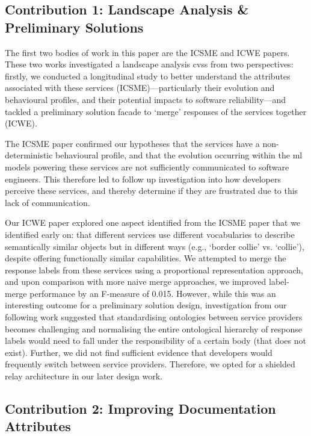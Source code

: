 \subsection{Contribution 1: Landscape Analysis \& Preliminary Solutions}

The first two bodies of work in this paper are the ICSME and ICWE papers. These two works investigated a landscape analysis \glspl{cvs} from two perspectives: firstly, we conducted a longitudinal study to better understand the attributes associated with these services (ICSME)---particularly their evolution and behavioural profiles, and their potential impacts to software reliability---and tackled a preliminary solution facade to `merge' responses of the services together (ICWE). 

The ICSME paper confirmed our hypotheses that the services have a non-deterministic behavioural profile, and that the evolution occurring within the \gls{ml} models powering these services are not sufficiently communicated to software engineers. This therefore led to follow up investigation into how developers perceive these services, and thereby determine if they are frustrated due to this lack of communication. 

Our ICWE paper explored one aspect identified from the ICSME paper that we identified early on: that different services use different vocabularies to describe semantically similar objects but in different ways (e.g., `border collie' vs. `collie'), despite offering functionally similar capabilities. We attempted to merge the response labels from these services using a proportional representation approach, and upon comparison with more naive merge approaches, we improved label-merge performance by an F-measure of 0.015. However, while this was an interesting outcome for a preliminary solution design, investigation from our following work suggested that standardising ontologies between service providers becomes challenging and normalising the entire ontological hierarchy of response labels would need to fall under the responsibility of a certain body (that does not exist). Further, we did not find sufficient evidence that developers would frequently switch between service providers. Therefore, we opted for a shielded relay architecture in our later design work.  

\subsection{Contribution 2: Improving Documentation Attributes}

